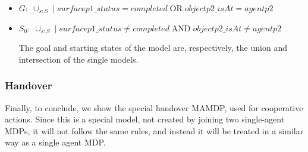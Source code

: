 \begin{itemize}
	\item $G:\; \cup_{s:S}\; |\; surfacep1\_status=completed\; \text{OR} \; objectp2\_isAt=agentp2$
	\item $S_0:\; \cup_{s:S} \; | \; surfacep1\_status \neq completed \; \text{AND} \; objectp2\_isAt \neq agentp2$

	The goal and starting states of the model are, respectively, the union and intersection of the single models.
\end{itemize}


\subsubsection{Handover}
Finally, to conclude, we show the special handover MAMDP, used for cooperative actions. Since this is a special model, not created by joining two single-agent MDPs, it will not follow the same rules, and instead it will be treated in a similar way as a single agent MDP.

